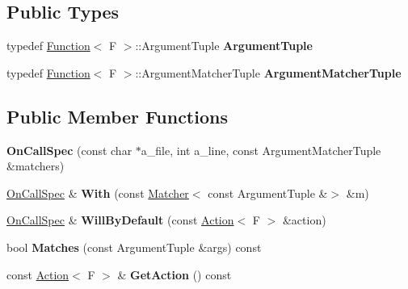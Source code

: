 \subsection*{Public Types}
\begin{DoxyCompactItemize}
\item 
\mbox{\label{classtesting_1_1internal_1_1_on_call_spec_a70ffab8b915b7b48a90f5ce256da806f}} 
typedef \mbox{\hyperlink{structtesting_1_1internal_1_1_function}{Function}}$<$ F $>$\+::Argument\+Tuple {\bfseries Argument\+Tuple}
\item 
\mbox{\label{classtesting_1_1internal_1_1_on_call_spec_a3240f159f0a9d8cda208bc256da35074}} 
typedef \mbox{\hyperlink{structtesting_1_1internal_1_1_function}{Function}}$<$ F $>$\+::Argument\+Matcher\+Tuple {\bfseries Argument\+Matcher\+Tuple}
\end{DoxyCompactItemize}
\subsection*{Public Member Functions}
\begin{DoxyCompactItemize}
\item 
\mbox{\label{classtesting_1_1internal_1_1_on_call_spec_ac7077e8162a10714e463b64a3cc7d054}} 
{\bfseries On\+Call\+Spec} (const char $\ast$a\+\_\+file, int a\+\_\+line, const Argument\+Matcher\+Tuple \&matchers)
\item 
\mbox{\label{classtesting_1_1internal_1_1_on_call_spec_a4d9152c0f74245670a1222aae2262d5e}} 
\mbox{\hyperlink{classtesting_1_1internal_1_1_on_call_spec}{On\+Call\+Spec}} \& {\bfseries With} (const \mbox{\hyperlink{classtesting_1_1_matcher}{Matcher}}$<$ const Argument\+Tuple \&$>$ \&m)
\item 
\mbox{\label{classtesting_1_1internal_1_1_on_call_spec_a1c6303bf46983f20f4d2a61752fa8663}} 
\mbox{\hyperlink{classtesting_1_1internal_1_1_on_call_spec}{On\+Call\+Spec}} \& {\bfseries Will\+By\+Default} (const \mbox{\hyperlink{classtesting_1_1_action}{Action}}$<$ F $>$ \&action)
\item 
\mbox{\label{classtesting_1_1internal_1_1_on_call_spec_a8113d1ec5775715637a87875dee6cc68}} 
bool {\bfseries Matches} (const Argument\+Tuple \&args) const
\item 
\mbox{\label{classtesting_1_1internal_1_1_on_call_spec_a3ef8e41380326823fb5b701f3c52cdb6}} 
const \mbox{\hyperlink{classtesting_1_1_action}{Action}}$<$ F $>$ \& {\bfseries Get\+Action} () const
\end{DoxyCompactItemize}

